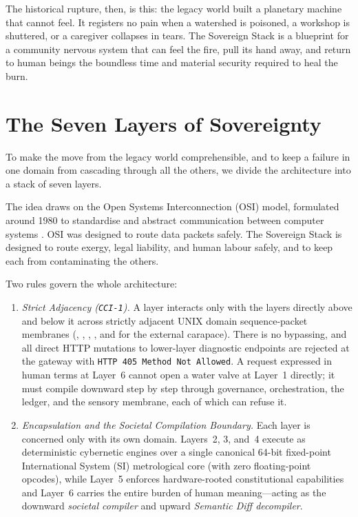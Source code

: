The historical rupture, then, is this: the legacy world built a planetary machine that cannot feel. It registers no pain when a watershed is poisoned, a workshop is shuttered, or a caregiver collapses in tears. The Sovereign Stack is a blueprint for a community nervous system that can feel the fire, pull its hand away, and return to human beings the boundless time and material security required to heal the burn.

\section{The Seven Layers of Sovereignty}

To make the move from the legacy world comprehensible, and to keep a failure in one domain from cascading through all the others, we divide the architecture into a stack of seven layers.

The idea draws on the Open Systems Interconnection (OSI) model, formulated around 1980 to standardise and abstract communication between computer systems \parencite{zimmermann1980}. OSI was designed to route data packets safely. The Sovereign Stack is designed to route exergy, legal liability, and human labour safely, and to keep each from contaminating the others.

Two rules govern the whole architecture:
\begin{enumerate}
  \item \textit{Strict Adjacency (\texttt{CCI-1}).} A layer interacts only with the layers directly above and below it across strictly adjacent UNIX domain sequence-packet membranes (, , , , and  for the external carapace). There is no bypassing, and all direct HTTP mutations to lower-layer diagnostic endpoints are rejected at the gateway with \texttt{HTTP 405 Method Not Allowed}. A request expressed in human terms at Layer~6 cannot open a water valve at Layer~1 directly; it must compile downward step by step through governance, orchestration, the ledger, and the sensory membrane, each of which can refuse it.
  \item \textit{Encapsulation and the Societal Compilation Boundary.} Each layer is concerned only with its own domain. Layers~2, 3, and~4 execute as deterministic cybernetic engines over a single canonical 64-bit fixed-point International System (SI) metrological core (with zero floating-point opcodes), while Layer~5 enforces hardware-rooted constitutional capabilities and Layer~6 carries the entire burden of human meaning---acting as the downward \textit{societal compiler} and upward \textit{Semantic Diff decompiler}.
\end{enumerate}

